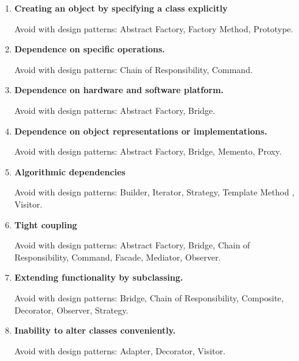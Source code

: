 \documentclass{article}
\begin{document}
\begin{enumerate}
    \item \textbf{Creating an object by specifying a class explicitly}
    
    Avoid with design patterns: Abstract Factory, Factory Method, Prototype. 
    
    \item \textbf{Dependence on specific operations.}
    
    Avoid with design patterns: Chain of Responsibility, Command.
    
    \item \textbf{Dependence on hardware and software platform.}
    
    Avoid with design patterns: Abstract Factory, Bridge.
    
    \item \textbf{Dependence on object representations or implementations.}
    
    Avoid with design patterns: Abstract Factory, Bridge, Memento, Proxy.
    
    \item \textbf{Algorithmic dependencies}
    
    Avoid with design patterns: Builder, Iterator, Strategy, Template Method , Visitor.
    
    \item \textbf{Tight coupling}
    
    Avoid with design patterns: Abstract Factory, Bridge, Chain of Responsibility, Command, Facade, Mediator, Observer.
    
    
    \item \textbf{Extending functionality by subclassing.}
    
    Avoid with design patterns: Bridge, Chain of Responsibility, Composite,  Decorator, Observer, Strategy.
    
    \item \textbf{Inability to alter classes conveniently.}
    
    Avoid with design patterns: Adapter, Decorator, Visitor.
\end{enumerate}
\end{document}
